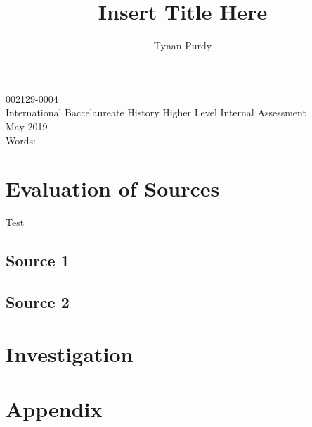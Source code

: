 \documentclass[12pt,letterpaper]{article}
\title{Insert Title Here}
\author{Tynan Purdy}
\date{\vspace{-5ex}}
\begin{document}
\large
\parindent=0.5in
{\fontsize{12}{14.4}
	{\singlespace
	    \maketitle
	    \begin{center}
	    \vspace{4mm}
	    002129-0004 \\
	    \vspace{4mm}
	    International Baccelaureate History Higher Level Internal Assessment \\
	    \vspace{4mm}
	    May 2019 \\
	    \vspace{4mm}
	    Words:  \\ %
	\end{center}
	}
}	

\newpage
\tableofcontents

\newpage


\section{Evaluation of Sources}
Test \citep{guttmann}
\subsection{Source 1}

\subsection{Source 2}

\section{Investigation}

\newpage


\newpage
\section{Appendix}
\listoffigures
\end{document}
